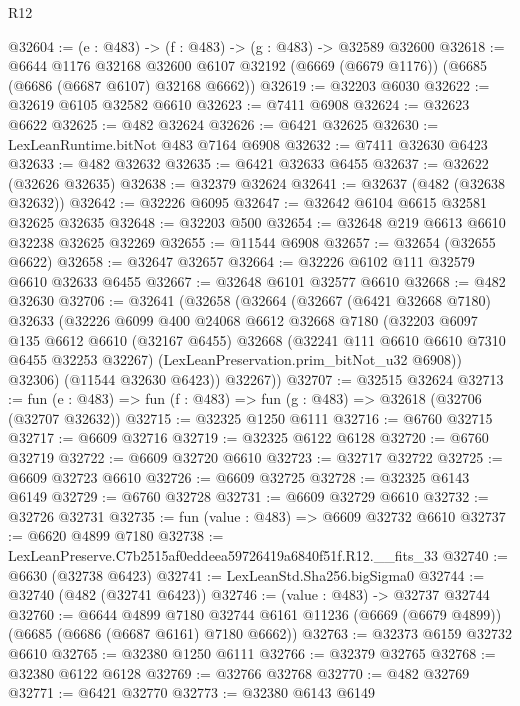 \begin{lexlean}{R12}
\begin{coremodule}
@32604 := (e : @483) -> (f : @483) -> (g : @483) -> @32589 @32600
@32618 := @6644
    @1176
    @32168
    @32600
    @6107
    @32192
    (@6669 (@6679 @1176))
    (@6685 (@6686 (@6687 @6107) @32168 @6662))
@32619 := @32203 @6030
@32622 := @32619 @6105 @32582 @6610
@32623 := @7411 @6908
@32624 := @32623 @6622
@32625 := @482 @32624
@32626 := @6421 @32625
@32630 := LexLeanRuntime.bitNot @483 @7164 @6908
@32632 := @7411 @32630 @6423
@32633 := @482 @32632
@32635 := @6421 @32633 @6455
@32637 := @32622 (@32626 @32635)
@32638 := @32379 @32624
@32641 := @32637 (@482 (@32638 @32632))
@32642 := @32226 @6095
@32647 := @32642 @6104 @6615 @32581 @32625 @32635
@32648 := @32203 @500
@32654 := @32648 @219 @6613 @6610 @32238 @32625 @32269
@32655 := @11544 @6908
@32657 := @32654 (@32655 @6622)
@32658 := @32647 @32657
@32664 := @32226 @6102 @111 @32579 @6610 @32633 @6455
@32667 := @32648 @6101 @32577 @6610
@32668 := @482 @32630
@32706 := @32641
    (@32658
      (@32664
        (@32667
          (@6421 @32668 @7180)
          @32633
          (@32226
            @6099
            @400
            @24068
            @6612
            @32668
            @7180
            (@32203
              @6097
              @135
              @6612
              @6610
              (@32167 @6455)
              @32668
              (@32241 @111 @6610 @6610 @7310 @6455 @32253 @32267)
              (LexLeanPreservation.prim_bitNot_u32 @6908))
            @32306)
          (@11544 @32630 @6423))
        @32267))
@32707 := @32515 @32624
@32713 := fun (e : @483) => fun (f : @483) => fun (g : @483) => @32618 (@32706 (@32707 @32632))
@32715 := @32325 @1250 @6111
@32716 := @6760 @32715
@32717 := @6609 @32716
@32719 := @32325 @6122 @6128
@32720 := @6760 @32719
@32722 := @6609 @32720 @6610
@32723 := @32717 @32722
@32725 := @6609 @32723 @6610
@32726 := @6609 @32725
@32728 := @32325 @6143 @6149
@32729 := @6760 @32728
@32731 := @6609 @32729 @6610
@32732 := @32726 @32731
@32735 := fun (value : @483) => @6609 @32732 @6610
@32737 := @6620 @4899 @7180
@32738 := LexLeanPreserve.C7b2515af0eddeea59726419a6840f51f.R12.__fits_33
@32740 := @6630 (@32738 @6423)
@32741 := LexLeanStd.Sha256.bigSigma0
@32744 := @32740 (@482 (@32741 @6423))
@32746 := (value : @483) -> @32737 @32744
@32760 := @6644
    @4899
    @7180
    @32744
    @6161
    @11236
    (@6669 (@6679 @4899))
    (@6685 (@6686 (@6687 @6161) @7180 @6662))
@32763 := @32373 @6159 @32732 @6610
@32765 := @32380 @1250 @6111
@32766 := @32379 @32765
@32768 := @32380 @6122 @6128
@32769 := @32766 @32768
@32770 := @482 @32769
@32771 := @6421 @32770
@32773 := @32380 @6143 @6149

\end{coremodule}
\end{lexlean}
